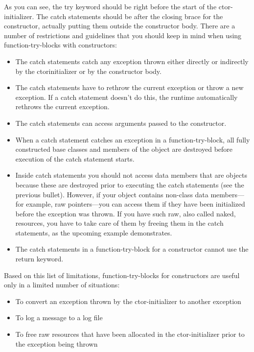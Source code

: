 As you can see, the try keyword should be right before the start of the ctor-initializer. The catch statements should be after the closing brace for the constructor, actually putting them outside the constructor body. There are a number of restrictions and guidelines that you should keep in mind when using function-try-blocks with constructors:

\begin{itemize}
\item
The catch statements catch any exception thrown either directly or indirectly by the ctorinitializer or by the constructor body.

\item
The catch statements have to rethrow the current exception or throw a new exception. If a catch statement doesn’t do this, the runtime automatically rethrows the current exception.

\item
The catch statements can access arguments passed to the constructor.

\item
When a catch statement catches an exception in a function-try-block, all fully constructed base classes and members of the object are destroyed before execution of the catch statement starts.

\item
Inside catch statements you should not access data members that are objects because these are destroyed prior to executing the catch statements (see the previous bullet). However, if your object contains non-class data members—for example, raw pointers—you can access them if they have been initialized before the exception was thrown. If you have such raw, also called naked, resources, you have to take care of them by freeing them in the catch statements, as the upcoming example demonstrates.

\item
The catch statements in a function-try-block for a constructor cannot use the return keyword.
\end{itemize}

Based on this list of limitations, function-try-blocks for constructors are useful only in a limited number of situations:

\begin{itemize}
\item
To convert an exception thrown by the ctor-initializer to another exception

\item
To log a message to a log file

\item
To free raw resources that have been allocated in the ctor-initializer prior to the exception being thrown
\end{itemize}

